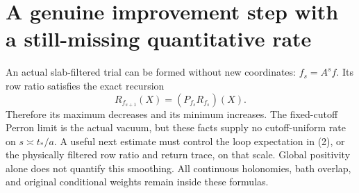 \documentclass{article}
\begin{document}
\section*{A genuine improvement step with a still-missing quantitative rate}
An actual slab-filtered trial can be formed without new coordinates: $f_s=A^s f$. Its row ratio satisfies the exact recursion
\[
 R_{f_{s+1}}(X)=(P_{f_s}R_{f_s})(X).
\]
Therefore its maximum decreases and its minimum increases. The fixed-cutoff Perron limit is the actual vacuum, but these facts supply no cutoff-uniform rate on $s\asymp t_*/a$. A useful next estimate must control the loop expectation in (2), or the physically filtered row ratio and return trace, on that scale. Global positivity alone does not quantify this smoothing. All continuous holonomies, bath overlap, and original conditional weights remain inside these formulas.
\end{document}
